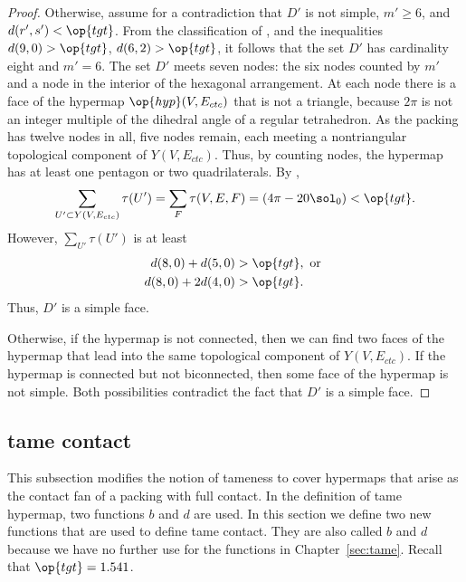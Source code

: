 \begin{proof}
  Otherwise, assume for a contradiction
that $D'$ is not simple, $m'\ge 6$, and $d(r',s')<\op{tgt}$.  From the
classification of \cite[p.~126,~Fig.~12.1]{Hales:2006:DCG}, and the
inequalities $d(9,0) > \op{tgt}$, $d(6,2) > \op{tgt}$, it follows that
the set $D'$ has cardinality eight and $m'=6$.  The set $D'$ meets seven
nodes: the six nodes counted by $m'$ and a node in the interior  of
the hexagonal arrangement.  At each node there is a face of the hypermap
$\op{hyp}(V,E_{ctc})$ that is not a triangle, because $2\pi$ is not an integer multiple
of the dihedral angle of a
regular tetrahedron.  As the packing has twelve nodes in all,
 five  nodes remain, each  meeting a
nontriangular topological component of $Y(V,E_{ctc})$.  Thus, by counting nodes,
the hypermap has
 at least one pentagon or two quadrilaterals.  By ,
\[
  \sum_{U'\subset Y(V,E_{ctc})} \tau(U') 
=\sum_F \tau(V,E,F) = (4\pi - 20\sol_0) < \op{tgt}.
\]
However, $\sum_{U'} \tau(U')$ is at least
\begin{align*}
d(8,0) + d(5,0) &> \op{tgt}, \text{ or }\\
d(8,0) + 2 d(4,0) &> \op{tgt}.
\end{align*}
Thus, $D'$ is a simple face.
%
%

  Otherwise, if the hypermap is
not connected, then we can find two faces of the hypermap that lead
into the same topological component of $Y(V,E_{ctc})$.  If the
hypermap is connected but not biconnected, then some face of the
hypermap is not simple.  Both possibilities contradict the fact that
$D'$ is a simple face.
\end{proof}



\subsection{tame contact}

This subsection modifies the notion of tameness to cover hypermaps
that arise as the contact fan of a packing with full contact.  In the
definition of tame hypermap, two functions $b$ and $d$ are used.  In
this section we define two new functions that are used to define tame
contact.  They are also  called $b$ and $d$ because we have no
further use for the functions in Chapter~\ref{sec:tame}.  
Recall that $\op{tgt}=1.541$.
%
%

